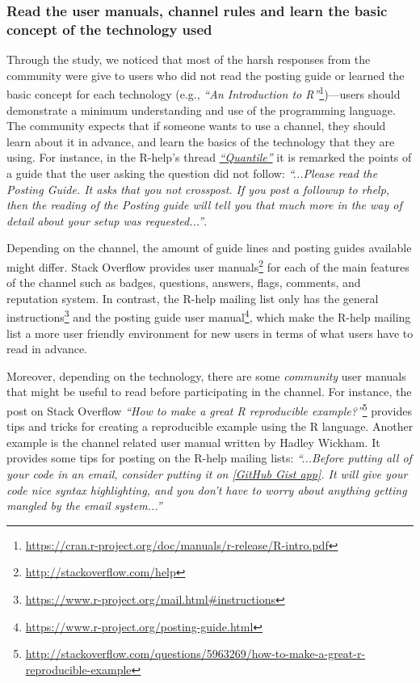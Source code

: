 \subsubsection{Read the user manuals, channel rules and learn the basic concept of the technology used}

    Through the study, we noticed that most of the harsh responses from the community were give to users who did not read the posting guide or learned the basic concept for each technology (e.g., \textit{``An Introduction to R''}\footnote{\url{https://cran.r-project.org/doc/manuals/r-release/R-intro.pdf}})---users should demonstrate a minimum understanding and use of the programming language.
    The community expects that if someone wants to use a channel, they should learn about it in advance, and learn the basics of the technology that they are using.
    For instance, in the R-help's thread \textit{\href{http://goo.gl/Dc8gXw}{``Quantile''}} it is remarked the points of a guide that the user asking the question did not follow: \textit{``...Please read the Posting Guide. It asks that you not crosspost. If you post a followup to rhelp, then the reading of the Posting guide will tell you that much more in the way of detail about your setup was requested...''}.

    Depending on the channel, the amount of guide lines and posting guides available might differ. 
    Stack Overflow provides user manuals\footnote{\url{http://stackoverflow.com/help}} for each of the main features of the channel such as badges, questions, answers, flags, comments, and reputation system.
    In contrast, the R-help mailing list only has the general instructions\footnote{\url{https://www.r-project.org/mail.html\#instructions}} and the posting guide user manual\footnote{\url{https://www.r-project.org/posting-guide.html}}, which make the R-help mailing list a more user friendly environment for new users in terms of what users have to read in advance.

    Moreover, depending on the technology, there are some \textit{community} user manuals that might be useful to read before participating in the channel.
    For instance, the post on Stack Overflow \textit{``How to make a great R reproducible example?''}\footnote{\url{http://stackoverflow.com/questions/5963269/how-to-make-a-great-r-reproducible-example}} provides tips and tricks for creating a reproducible example using the R language.
    Another example is the channel related user manual written by Hadley Wickham.
    It provides some tips for posting on the R-help mailing lists: \textit{``...Before putting all of your code in an email, consider putting it on \href{http://gist.github.com/}{[GitHub Gist app]}. It will give your code nice syntax highlighting, and you don't have to worry about anything getting mangled by the email system...''}

